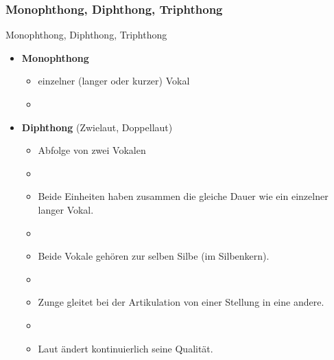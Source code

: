 %
\subsubsection{Monophthong, Diphthong, Triphthong}

\begin{frame}{Monophthong, Diphthong, Triphthong}

\begin{itemize}
	\item \textbf{Monophthong}

	\begin{itemize}		
		\item einzelner (langer oder kurzer) Vokal
		\item[]
	\end{itemize}
	
	\item \textbf{Diphthong} (Zwielaut, Doppellaut)
	
	\begin{itemize}		
		\item Abfolge von zwei Vokalen
		\item[]
		\item Beide Einheiten haben zusammen die gleiche Dauer wie ein einzelner langer Vokal.
		\item[]
		\item Beide Vokale gehören zur selben Silbe (im Silbenkern).
		\item[]
		\item Zunge gleitet bei der Artikulation von einer Stellung in eine andere.
		\item[]
		\item Laut ändert kontinuierlich seine Qualität.
	\end{itemize}
	
\end{itemize}	

\end{frame}



